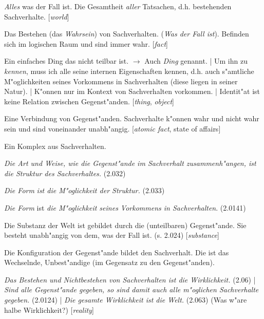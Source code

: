 \documentclass[emulatestandardclasses]{scrartcl}
\begin{document}
\begin{description}[leftmargin=!,labelwidth=\widthof{\bfseries Konfiguration}]
  \item[Welt] \emph{Alles} was der Fall ist. Die Gesamtheit \emph{aller} Tatsachen, d.h.  bestehenden Sachverhalte. [\emph{world}]
  \item[Tatsache] Das Bestehen (das \emph{Wahrsein}) von Sachverhalten. (\emph{Was der Fall ist}). Befinden sich im logischen Raum und sind immer wahr. [\emph{fact}]
  \item[Gegenstand] Ein einfaches Ding das nicht teilbar ist. $\rightarrow$ Auch \emph{Ding} genannt. | Um ihn zu \emph{kennen}, muss ich alle seine internen Eigenschaften kennen, d.h. auch s"amtliche M"oglichkeiten seines Vorkommens in Sachverhalten (diese liegen in seiner Natur). | K"onnen nur im Kontext von Sachverhalten vorkommen. | Identit"at ist keine Relation zwischen Gegenst"anden. [\emph{thing}, \emph{object}]
  \item[Sachverhalt] Eine Verbindung von Gegenst"anden. Sachverhalte k"onnen wahr und nicht wahr sein und sind voneinander unabh"angig. [\emph{atomic fact}, {state of affairs}]
  \item[Sachlage] Ein Komplex aus Sachverhalten.
  \item[Struktur] \emph{Die Art und Weise, wie die Gegenst"ande im Sachverhalt zusammenh"angen, ist die Struktur des Sachverhaltes.} (2.032)
  \item[Form des ??] \emph{Die Form} \emph{ist die M"oglichkeit der Struktur.} (2.033)  \item[Form des Gegenstands] \emph{Die Form} ist \emph{die M"oglichkeit seines Vorkommens in Sachverhalten}. (2.0141)
  \item[Substanz] Die Substanz der Welt ist gebildet durch die (unteilbaren) Gegenst"ande. Sie besteht unabh"angig von dem, was der Fall ist. (s. 2.024) [\emph{substance}]
  \item[Konfiguration] Die Konfiguration der Gegenst"ande bildet den Sachverhalt. Die ist das Wechselnde, Unbest"andige (im Gegensatz zu den Gegenst"anden).
  \item[Wirklichkeit] \emph{Das Bestehen und Nichtbestehen von Sachverhalten ist die Wirklichkeit.} (2.06) | \emph{Sind alle Gegenst"ande gegeben, so sind damit auch alle m"oglichen Sachverhalte gegeben.} (2.0124) | \emph{Die gesamte Wirklichkeit ist die Welt.} (2.063) {\color{red}(Was w"are halbe Wirklichkeit?)} [\emph{reality}]
\end{description}
\end{document}
